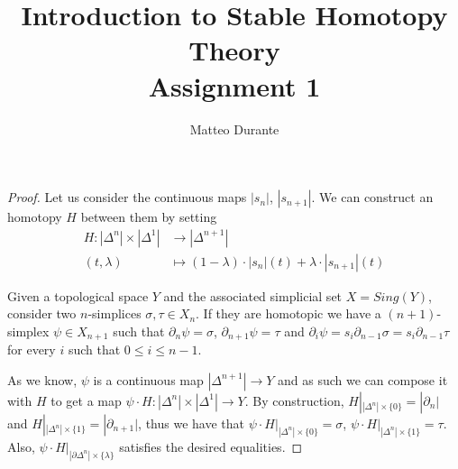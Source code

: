 \documentclass[a4paper,11pt,openany]{scrartcl}
\begin{document}
\title{Introduction to Stable Homotopy Theory\\ Assignment 1}

\author{Matteo Durante}

\maketitle

\begin{proof}
    Let us consider the continuous maps $|s_n|$, $|s_{n+1}|$. We can construct
    an homotopy $H$ between them by setting
    \begin{align*}
        H\colon|\Delta^n|\times|\Delta^1|&\rightarrow |\Delta^{n+1}| \\
        (t,\lambda) &\mapsto (1-\lambda)\cdot |s_n|(t)+\lambda\cdot
        |s_{n+1}|(t)
    \end{align*}

    Given a topological space $Y$ and the associated simplicial set $X=Sing(Y)$,
    consider two $n$-simplices $\sigma,\tau\in X_n$. If they are
    homotopic we have a $(n+1)$-simplex $\psi\in X_{n+1}$ such that
    $\partial_n\psi=\sigma$, $\partial_{n+1}\psi=\tau$ and
    $\partial_i\psi=s_i\partial_{n-1}\sigma=s_i\partial_{n-1}\tau$ for every $i$ such
    that $0\leq i\leq n-1$.

    As we know, $\psi$ is a continuous map $|\Delta^{n+1}|\rightarrow Y$ and as
    such we can compose it with $H$ to get a map $\psi\cdot
    H\colon|\Delta^n|\times|\Delta^1|\rightarrow Y$. By construction,
    $H|_{|\Delta^n|\times\{0\}}=|\partial_n|$ and
    $H|_{|\Delta^n|\times\{1\}}=|\partial_{n+1}|$, thus we have that $\psi\cdot
    H|_{|\Delta^n|\times\{0\}}=\sigma$, $\psi\cdot
    H|_{|\Delta^n|\times\{1\}}=\tau$. Also, $\psi\cdot
    H|_{|\partial\Delta^n|\times\{\lambda\}}$ satisfies the desired equalities.


\end{proof}
\end{document}

